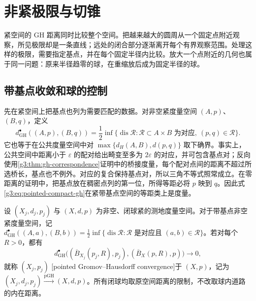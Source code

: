 
% 
% 

\section{非紧极限与切锥}
\label{g3:sec:1004}

紧空间的 GH 距离同时比较整个空间。把越来越大的圆周从一个固定点附近观察，所见极限却是一条直线；远处的闭合部分逐渐离开每个有界观察范围。处理这样的极限，需要指定基点，并在每个固定半径内比较。放大一个点附近的几何也属于同一问题：原来半径趋零的球，在重缩放后成为固定半径的球。

\subsection{带基点收敛和球的控制}
\label{g3:subsec:1004:01}
先在紧空间上把基点也列为需要匹配的数据。对非空紧度量空间 \((A,p)\)、\((B,q)\)，定义
\begin{equation}\label{g3:eq:pointed-compact-gh}
	d_{\mathrm{GH}}^\bullet((A,p),(B,q))
	=\frac12\inf\{\operatorname{dis}\mathcal R:
	\mathcal R\subset A\times B\text{ 为对应},\ (p,q)\in\mathcal R\}.
\end{equation}
它也等于在公共度量空间中对
\(\max\{d_H(A,B),d(p,q)\}\) 取下确界。事实上，公共空间中距离小于 \(\varepsilon\) 的配对给出畸变至多为 \(2\varepsilon\) 的对应，并可包含基点对；反向使用\cref{g3:thm:gh-correspondence}证明中的桥接度量，每个配对点间的距离不超过所选桥长，基点也不例外。对应的复合保持基点对，所以三角不等式照常成立。在零距离的证明中，把基点放在稠密点列的第一位，所得等距必将 \(p\) 映到 \(q\)。因此式\eqref{g3:eq:pointed-compact-gh}在紧带基点空间的等距类上是度量。

\begin{definition}\label{g3:def:pointed-gh-convergence}
	设 \((X_j,d_j,p_j)\) 与 \((X,d,p)\) 为非空、闭球紧的测地度量空间。对于带基点非空紧度量空间，记 \(d_{\mathrm{GH}}^\bullet((A,a),(B,b))=\tfrac12\inf\{\operatorname{dis}\mathcal R:\mathcal R\text{ 是对应且 }(a,b)\in\mathcal R\}\)。若对每个 \(R>0\)，都有
	\begin{equation}\label{g3:eq:pointed-gh-balls}
		d_{\mathrm{GH}}^\bullet
		\bigl((\overline B_{X_j}(p_j,R),p_j),
		(\overline B_X(p,R),p)\bigr)\longrightarrow0,
	\end{equation}
	就称 \((X_j,p_j)\) [pointed Gromov--Hausdorff convergence]于 \((X,p)\)，记为
	\((X_j,d_j,p_j)\xrightarrow{\mathrm{pGH}}(X,d,p)\)。所有闭球均取原空间距离的限制，不改取球内道路的内在距离。
\end{definition}

